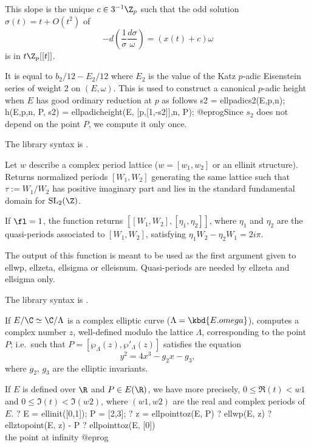 This slope is the unique $c \in 3^{-1}\Z_p$ such that the odd solution
  $\sigma(t) = t + O(t^2)$ of
$$ - d(\dfrac{1}{\sigma} \dfrac{d \sigma}{\omega})
 = (x(t) + c) \omega$$
is in $t\Z_p[[t]]$.

It is equal to $b_2/12 - E_2/12$ where $E_2$ is the value of the Katz
$p$-adic Eisenstein series of weight 2 on $(E,\omega)$. This is
used to construct a canonical $p$-adic height when $E$ has good ordinary
reduction at $p$ as follows
\bprog
s2 = ellpadics2(E,p,n);
h(E,p,n, P, s2) = ellpadicheight(E, [p,[1,-s2]],n, P);
@eprog\noindent Since $s_2$ does not depend on the point $P$, we compute it
only once.

The library syntax is .

\label{se:ellperiods}
Let $w$ describe a complex period lattice ($w = [w_1,w_2]$
or an ellinit structure). Returns normalized periods $[W_1,W_2]$ generating
the same lattice such that $\tau := W_1/W_2$ has positive imaginary part
and lies in the standard fundamental domain for $\text{SL}_2(\Z)$.

If $\fl = 1$, the function returns $[[W_1,W_2], [\eta_1,\eta_2]]$, where
$\eta_1$ and $\eta_2$ are the quasi-periods associated to
$[W_1,W_2]$, satisfying $\eta_1 W_2 - \eta_2 W_1 = 2 i \pi$.

The output of this function is meant to be used as the first argument
given to ellwp, ellzeta, ellsigma or elleisnum. Quasi-periods are
needed by ellzeta and ellsigma only.

The library syntax is .

\label{se:ellpointtoz}
If $E/\C \simeq \C/\Lambda$ is a complex elliptic curve ($\Lambda =
\kbd{E.omega}$),
computes a complex number $z$, well-defined modulo the lattice $\Lambda$,
corresponding to the point $P$; i.e.~such that
 $P = [\wp_\Lambda(z),\wp'_\Lambda(z)]$
satisfies the equation
$$y^2 = 4x^3 - g_2 x - g_3,$$
where $g_2$, $g_3$ are the elliptic invariants.

If $E$ is defined over $\R$ and $P\in E(\R)$, we have more precisely, $0 \leq
\Re(t) < w1$ and $0 \leq \Im(t) < \Im(w2)$, where $(w1,w2)$ are the real and
complex periods of $E$.
\bprog
? E = ellinit([0,1]); P = [2,3];
? z = ellpointtoz(E, P)
? ellwp(E, z)
? ellztopoint(E, z) - P
? ellpointtoz(E, [0]) \\ the point at infinity
@eprog

